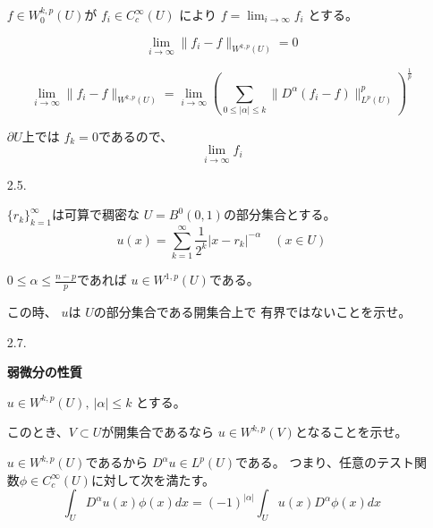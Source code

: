\documentclass[12pt,b5paper]{ltjsarticle}
\begin{document}
\begin{enumerate}
       $f\in W^{k,p}_{0}(U)$が
       $f_{i}\in C^{\infty}_{c}(U)$
       により
       $f=\lim_{i\to\infty}f_{i}$
       とする。

       \begin{equation}
        \lim_{i\to\infty} \|f_{i}-f \|_{W^{k,p}(U)}=0
       \end{equation}

       \begin{equation}
        \lim_{i\to\infty} \|f_{i}-f \|_{W^{k,p}(U)}
         =
         \lim_{i\to\infty}
         \left( \sum_{0\leq \lvert \alpha \rvert \leq k}
          \| D^{\alpha}(f_{i}-f) \|_{L^{p}(U)}^{p}
         \right)^{\frac{1}{p}}
       \end{equation}


       $\partial U$上では
       $f_{k}=0$であるので、
       \begin{equation}
        \lim_{i\to\infty}f_{i}
       \end{equation}





       \hrulefill

 \item [2.5.]

       $\{r_{k}\}_{k=1}^{\infty}$は可算で稠密な
       $U=B^{0}(0,1)$の部分集合とする。
       \begin{equation}
        u(x) =
         \sum_{k=1}^{\infty} \frac{1}{2^{k}} \lvert x-r_{k} \rvert ^{-\alpha}
         \quad
         (x\in U)
       \end{equation}

       $0 \leq \alpha \leq \frac{n-p}{p}$であれば
       $u\in W^{1,p}(U)$である。

       この時、
       $u$は
       $U$の部分集合である開集合上で
       有界ではないことを示せ。
       

       \dotfill

       \hrulefill

 \item [2.7.]


       \textbf{弱微分の性質}
       
       $u\in W^{k,p}(U),\: \lvert \alpha \rvert \leq k$
       とする。

       このとき、$V\subset U$が開集合であるなら
       $u\in W^{k,p}(V)$となることを示せ。

       \dotfill


       $u\in W^{k,p}(U)$であるから
       $D^{\alpha}u \in L^{p}(U)$である。
       つまり、任意のテスト関数$\phi\in C^{\infty}_{c}(U)$に対して次を満たす。
       \begin{equation}
        \int_{U} D^{\alpha}u(x) \phi(x) dx
         = (-1)^{\lvert \alpha \rvert}\int_{U} u(x) D^{\alpha}\phi(x) dx
         \label{eq_weak_deriva}
       \end{equation}


\end{enumerate}
\end{document}
